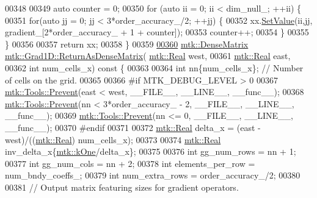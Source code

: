 \begin{DoxyCode}
{{00348 
00349   \textcolor{keyword}{auto} counter = 0;
00350   \textcolor{keywordflow}{for} (\textcolor{keyword}{auto} ii = 0; ii < dim\_null\_; ++ii) \{
00351     \textcolor{keywordflow}{for}(\textcolor{keyword}{auto} jj = 0; jj < 3*order\_accuracy\_/2; ++jj) \{
00352       xx.\hyperlink{classmtk_1_1DenseMatrix_a784ce5784109ac86bfb9d8562b334b13}{SetValue}(ii,jj, gradient\_[2*order\_accuracy\_ + 1 + counter]);
00353       counter++;
00354     \}
00355   \}
00356 
00357   \textcolor{keywordflow}{return} xx;
00358 \}
00359 
\hypertarget{mtk__grad__1d_8cc_source_l00360}{}\hyperlink{classmtk_1_1Grad1D_a77b2eddbe4ab03f469306c604d505b1a}{00360} \hyperlink{classmtk_1_1DenseMatrix}{mtk::DenseMatrix} \hyperlink{classmtk_1_1Grad1D_a77b2eddbe4ab03f469306c604d505b1a}{mtk::Grad1D::ReturnAsDenseMatrix}(
      \hyperlink{group__c01-roots_gac080bbbf5cbb5502c9f00405f894857d}{mtk::Real} west,
00361                                                   \hyperlink{group__c01-roots_gac080bbbf5cbb5502c9f00405f894857d}{mtk::Real} east,
00362                                                   \textcolor{keywordtype}{int} num\_cells\_x)\textcolor{keyword}{ const }\{
00363 
00364   \textcolor{keywordtype}{int} nn\{num\_cells\_x\}; \textcolor{comment}{// Number of cells on the grid.}
00365 
00366 \textcolor{preprocessor}{  #if MTK\_DEBUG\_LEVEL > 0}
00367   \hyperlink{classmtk_1_1Tools_a332324c6f25e66be9dff48c5987a3b9f}{mtk::Tools::Prevent}(east < west, \_\_FILE\_\_, \_\_LINE\_\_, \_\_func\_\_);
00368   \hyperlink{classmtk_1_1Tools_a332324c6f25e66be9dff48c5987a3b9f}{mtk::Tools::Prevent}(nn < 3*order\_accuracy\_ - 2, \_\_FILE\_\_, \_\_LINE\_\_, \_\_func\_\_);
00369   \hyperlink{classmtk_1_1Tools_a332324c6f25e66be9dff48c5987a3b9f}{mtk::Tools::Prevent}(nn <= 0, \_\_FILE\_\_, \_\_LINE\_\_, \_\_func\_\_);
00370 \textcolor{preprocessor}{  #endif}
00371 
00372   \hyperlink{group__c01-roots_gac080bbbf5cbb5502c9f00405f894857d}{mtk::Real} delta\_x = (east - west)/((\hyperlink{group__c01-roots_gac080bbbf5cbb5502c9f00405f894857d}{mtk::Real}) num\_cells\_x);
00373 
00374   \hyperlink{group__c01-roots_gac080bbbf5cbb5502c9f00405f894857d}{mtk::Real} inv\_delta\_x\{\hyperlink{group__c01-roots_ga26407c24d43b6b95480943340d285c71}{mtk::kOne}/delta\_x\};
00375 
00376   \textcolor{keywordtype}{int} gg\_num\_rows = nn + 1;
00377   \textcolor{keywordtype}{int} gg\_num\_cols = nn + 2;
00378   \textcolor{keywordtype}{int} elements\_per\_row = num\_bndy\_coeffs\_;
00379   \textcolor{keywordtype}{int} num\_extra\_rows = order\_accuracy\_/2;
00380 
00381   \textcolor{comment}{// Output matrix featuring sizes for gradient operators.}
}}
\end{DoxyCode}
